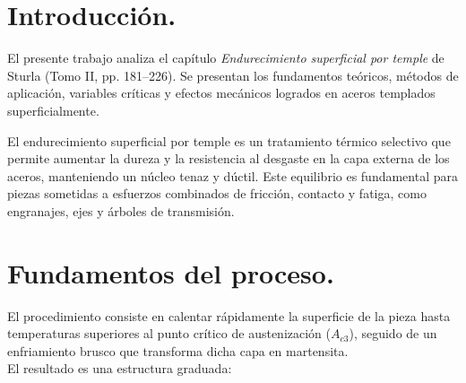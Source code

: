 \documentclass[12pt,a4paper]{article}
\begin{document}

\newpage
\tableofcontents

\begin{abstract}
    A partir de la bibliografía listada a continuación, analice e investigue el contenido del tratamiento térmico indicado por la Cátedra a fin de adquirir la capacidad de explicar el significado de la información que allí se detalla y las fallas asociadas cada tratamiento térmico:
    \begin{itemize}
        \item Sturla, A.E. Tratamientos térmicos de los aceros. Tomo II. Nueva Librería. 1era Edición. Año 2002. [NOTA: Anualmente la Cátedra asignará los temas a cada equipo de trabajo] \{MM-CAD-0.0.0\}.
        \begin{itemize}
            \item Cap. VI Endurecimiento Superficial por Temple (pp.182-266) [Caso 2025].
        \end{itemize}
    \end{itemize}
\end{abstract}

\section{Introducción.}

El presente trabajo analiza el capítulo \emph{Endurecimiento superficial por temple} de Sturla (Tomo II, pp. 181--226). Se presentan los fundamentos teóricos, métodos de aplicación, variables críticas y efectos mecánicos logrados en aceros templados superficialmente.

El endurecimiento superficial por temple es un tratamiento térmico selectivo que permite aumentar la dureza y la resistencia al desgaste en la capa externa de los aceros, manteniendo un núcleo tenaz y dúctil. 
Este equilibrio es fundamental para piezas sometidas a esfuerzos combinados de fricción, contacto y fatiga, como engranajes, ejes y árboles de transmisión.

\section{Fundamentos del proceso.}

El procedimiento consiste en calentar rápidamente la superficie de la pieza hasta temperaturas superiores al punto crítico de austenización ($A_{c3}$), seguido de un enfriamiento brusco que transforma dicha capa en martensita.\\
El resultado es una estructura graduada:
\end{document}

